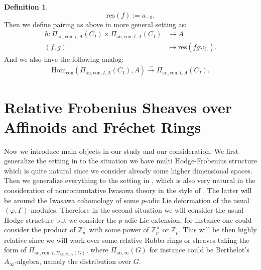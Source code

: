 \documentclass[12pt]{amsart}
\theoremstyle{definition}
\newtheorem{definition}[theorem]{Definition}
\numberwithin{equation}{section}
\begin{document}
\begin{definition}
\begin{displaymath}
\mathrm{res}(f):=a_{-\mathbf{1}}.	
\end{displaymath}
Then we define pairing as above in more general setting as:
\begin{align}
h:{\Pi_{\mathrm{an},\mathrm{con},I,A}(C_I)}\times {\Pi_{\mathrm{an},\mathrm{con},I,A}(C_I)} &\rightarrow A\\
(f,g) &\mapsto \mathrm{res}(fg\omega_{\ell_I}).	
\end{align}
And we also have the following analog:
\begin{align}
\mathrm{Hom}_{\mathrm{con}}({\Pi_{\mathrm{an},\mathrm{con},I,A}(C_I)},A)\overset{\sim}{\longrightarrow}	{\Pi_{\mathrm{an},\mathrm{con},I,A}(C_I)}.
\end{align}
\end{definition}














\newpage


\section{Relative Frobenius Sheaves over Affinoids and Fr\'echet Rings}

\noindent Now we introduce main objects in our study and our consideration. We first generalize the setting in \cite{KPX} to the situation we have multi Hodge-Frobenius structure which is quite natural since we consider already some higher dimensional spaces. Then we generalize everything to the setting in \cite{KP1}, which is also very natural in the consideration of noncommutative Iwasawa theory in the style of \cite{KP1}. The latter will be around the Iwasawa cohomology of some $p$-adic Lie deformation of the usual $(\varphi,\Gamma)$-modules. Therefore in the second situation we will consider the usual Hodge structure but we consider the $p$-adic Lie extension, for instance one could consider the product of $\mathbb{Z}_p^\times$ with some power of $\mathbb{Z}_p^\times$ or $\mathbb{Z}_p$. This will be then highly relative since we will work over some relative Robba rings or sheaves taking the form of $\Pi_{\mathrm{an},\mathrm{con},I,\Pi_{\mathrm{an},\infty,A}(G)}$, where $\Pi_{\mathrm{an},\infty}(G)$ for instance could be Berthelot's $A_\infty$-algebra, namely the distribution over $G$.\\
\end{document}
